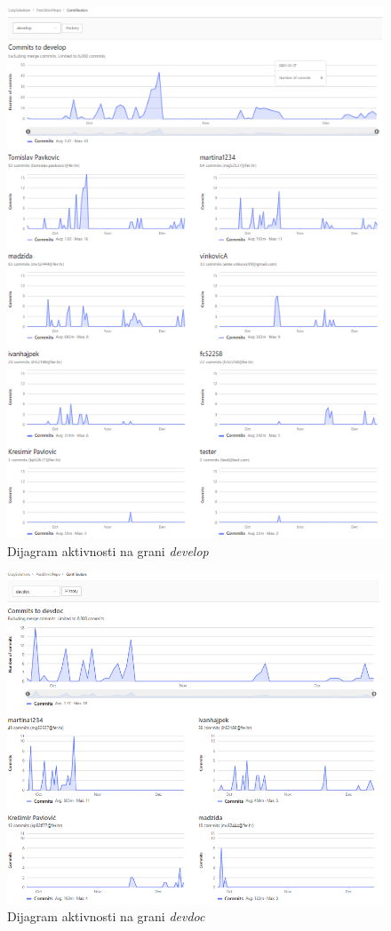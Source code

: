 				\begin{figure}[H]
					\centering
					\includegraphics[width=0.6\linewidth]{"slike/developBranchActivity"}
					\caption{Dijagram aktivnosti na grani \textit{develop}}
					\label{fig:dijagram-dvlp}
				\end{figure}
				

				\begin{figure}[H]
					\centering
					\includegraphics[width=0.75\linewidth]{"slike/devdocBranchActivity"}
					\caption{Dijagram aktivnosti na grani \textit{devdoc}}
					\label{fig:dijagram-doc}
				\end{figure}
